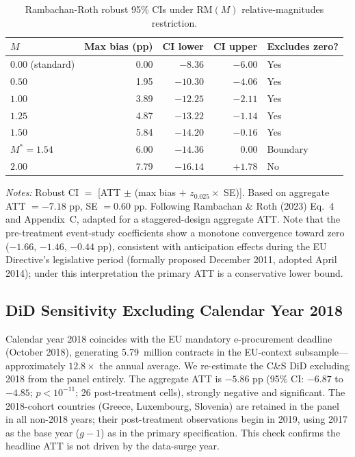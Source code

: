 \documentclass[11pt]{article}
\newcommand{\tabnoteblock}[1]{%
    \par\vspace{0.45em}%
    \begin{minipage}{0.98\linewidth}
    \footnotesize\raggedright #1
    \end{minipage}\par
}
\newcommand{\tabnotes}[1]{\tabnoteblock{\textit{Notes:} #1}}
\begin{document}
\begin{table}[H]
\centering
\caption{Rambachan-Roth robust 95\% CIs under $\text{RM}(M)$ relative-magnitudes restriction.}
\label{tab:rr_sensitivity}
\small
\begin{tabular}{lrrrl}
\toprule
\textbf{$M$} & \textbf{Max bias (pp)} & \textbf{CI lower} & \textbf{CI upper} & \textbf{Excludes zero?} \\
\midrule
$0.00$ (standard) & 0.00 & $-8.36$ & $-6.00$ & Yes \\
$0.50$ & 1.95 & $-10.30$ & $-4.06$ & Yes \\
$1.00$ & 3.89 & $-12.25$ & $-2.11$ & Yes \\
$1.25$ & 4.87 & $-13.22$ & $-1.14$ & Yes \\
$1.50$ & 5.84 & $-14.20$ & $-0.16$ & Yes \\
$M^* = 1.54$ & 6.00 & $-14.36$ & $0.00$ & Boundary \\
$2.00$ & 7.79 & $-16.14$ & $+1.78$ & No \\
\bottomrule
\end{tabular}
\tabnotes{Robust CI $=$ [ATT $\pm$ (max bias $+$ $z_{0.025}\times$ SE)]. Based on aggregate ATT $=-7.18$ pp, SE $=0.60$ pp. Following Rambachan \& Roth (2023) Eq.~4 and Appendix~C, adapted for a staggered-design aggregate ATT. Note that the pre-treatment event-study coefficients show a monotone convergence toward zero ($-1.66$, $-1.46$, $-0.44$ pp), consistent with anticipation effects during the EU Directive's legislative period (formally proposed December 2011, adopted April 2014); under this interpretation the primary ATT is a conservative lower bound.
}
\end{table}

\subsection{DiD Sensitivity Excluding Calendar Year 2018}

Calendar year 2018 coincides with the EU mandatory e-procurement deadline (October 2018), generating 5.79~million contracts in the EU-context subsample---approximately $12.8\times$ the annual average. We re-estimate the C\&S DiD excluding 2018 from the panel entirely. The aggregate ATT is $-5.86$ pp (95\% CI: $-6.87$ to $-4.85$; $p < 10^{-11}$; 26 post-treatment cells), strongly negative and significant. The 2018-cohort countries (Greece, Luxembourg, Slovenia) are retained in the panel in all non-2018 years; their post-treatment observations begin in 2019, using 2017 as the base year ($g-1$) as in the primary specification. This check confirms the headline ATT is not driven by the data-surge year.
\end{document}
